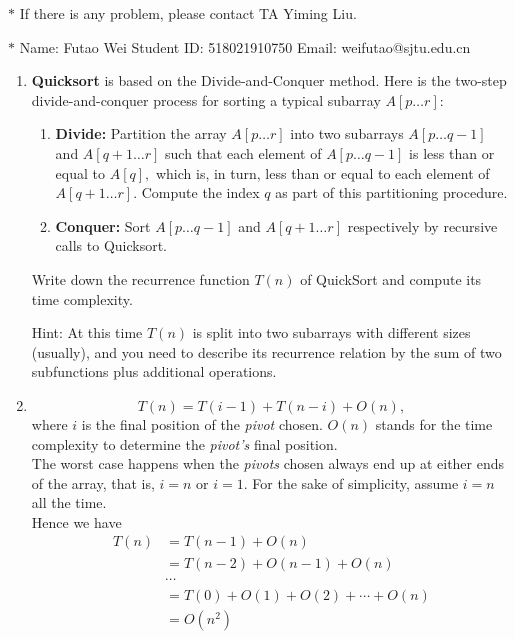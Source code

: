 \documentclass[12pt,a4paper]{article}
\makeatletter
\newtheorem*{solution}{Solution}
\theoremstyle{definition}
\renewenvironment{solution}[1][Solution] {\par\pushQED{\qed}\normalfont\topsep6\p@\@plus6\p@\relax\trivlist\item[\hskip\labelsep\bfseries#1\@addpunct{.}]\ignorespaces}{\popQED\endtrivlist\@endpefalse} \makeatother
\makeatother
\begin{document}
\noindent

\noindent{}
\begin{center}
\footnotesize{\color{red}$*$ If there is any problem, please contact TA Yiming Liu.}

\footnotesize{\color{blue}$*$ Name: Futao Wei  \quad Student ID: 518021910750 \quad Email: weifutao@sjtu.edu.cn}
\end{center}

\begin{enumerate}
    \item
    \textbf{Quicksort} is based on the Divide-and-Conquer method. Here is the two-step divide-and-conquer process for sorting a typical subarray $A[p \ldots r]$:
    \begin{enumerate}

    	\item
    	\textbf{Divide:} Partition the array $A[p \ldots r]$ into two subarrays $A[p \ldots q-1]$ and $A[q+1 \ldots r]$ such that each element of $A[p \ldots q-1]$ is less than or equal to $A[q],$ which is, in turn, less than or equal to each element of $A[q+1 \ldots r].$ Compute the index $q$ as part of this partitioning procedure.
    	
    	\item
    	\textbf{Conquer:} Sort $A[p \ldots q-1]$ and $A[q+1 \ldots r]$ respectively by recursive calls to Quicksort.
    	
    \end{enumerate}
    Write down the recurrence function $T(n)$ of QuickSort and compute its time complexity.

    {\color{purple}Hint: At this time $T(n)$ is split into two subarrays with different sizes (usually), and you need to describe its recurrence relation by the sum of two subfunctions plus additional operations.}
    
    \begin{solution}
    	\[
    		T(n) = T(i-1) + T(n-i) + O(n),
    	\]
    	where $i$ is the final position of the \emph{pivot} chosen. $O(n)$ stands for the time complexity to determine the \emph{pivot's} final position. \\
    	The worst case happens when the \emph{pivots} chosen always end up at either ends of the array, that is, $i = n$ or $i = 1$. For the sake of simplicity, assume $i = n$ all the time. \\
    	Hence we have 
    	\begin{align*}
	    	T(n) & = T(n-1) + O(n) \\
	    	& = T(n-2) + O(n-1) + O(n) \\
	    	& \cdots \\
	    	& = T(0) + O(1) + O(2) + \cdots + O(n) \\
	    	& = O(n^2)
    	\end{align*}
    \end{solution}


\end{enumerate}
\end{document}
